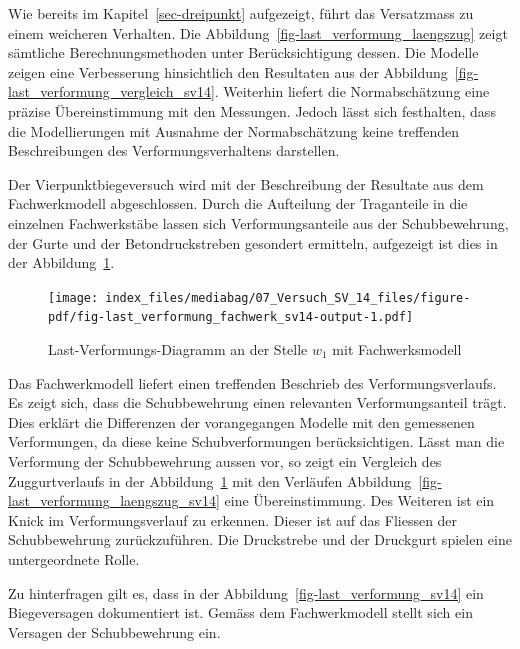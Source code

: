 \documentclass[
  12pt,
  letterpaper,
  egregdoesnotlikesansseriftitles]{scrreprt}
\begin{document}
Wie bereits im Kapitel~\ref{sec-dreipunkt} aufgezeigt, führt das
Versatzmass zu einem weicheren Verhalten. Die
Abbildung~\ref{fig-last_verformung_laengszug} zeigt sämtliche
Berechnungsmethoden unter Berücksichtigung dessen. Die Modelle zeigen
eine Verbesserung hinsichtlich den Resultaten aus der
Abbildung~\ref{fig-last_verformung_vergleich_sv14}. Weiterhin liefert
die Normabschätzung eine präzise Übereinstimmung mit den Messungen.
Jedoch lässt sich festhalten, dass die Modellierungen mit Ausnahme der
Normabschätzung keine treffenden Beschreibungen des
Verformungsverhaltens darstellen.

Der Vierpunktbiegeversuch wird mit der Beschreibung der Resultate aus
dem Fachwerkmodell abgeschlossen. Durch die Aufteilung der Traganteile
in die einzelnen Fachwerkstäbe lassen sich Verformungsanteile aus der
Schubbewehrung, der Gurte und der Betondruckstreben gesondert ermitteln,
aufgezeigt ist dies in der
Abbildung~\ref{fig-last_verformung_fachwerk_sv14}.

\begin{figure}[H]

{\centering \texttt{[image: index\_files/mediabag/07\_Versuch\_SV\_14\_files/figure-pdf/fig-last\_verformung\_fachwerk\_sv14-output-1.pdf]}

}

\caption{\label{fig-last_verformung_fachwerk_sv14}Last-Verformungs-Diagramm
an der Stelle \(w_1\) mit Fachwerksmodell}

\end{figure}

Das Fachwerkmodell liefert einen treffenden Beschrieb des
Verformungsverlaufs. Es zeigt sich, dass die Schubbewehrung einen
relevanten Verformungsanteil trägt. Dies erklärt die Differenzen der
vorangegangen Modelle mit den gemessenen Verformungen, da diese keine
Schubverformungen berücksichtigen. Lässt man die Verformung der
Schubbewehrung aussen vor, so zeigt ein Vergleich des Zuggurtverlaufs in
der Abbildung~\ref{fig-last_verformung_fachwerk_sv14} mit den Verläufen
Abbildung~\ref{fig-last_verformung_laengszug_sv14} eine Übereinstimmung.
Des Weiteren ist ein Knick im Verformungsverlauf zu erkennen. Dieser ist
auf das Fliessen der Schubbewehrung zurückzuführen. Die Druckstrebe und
der Druckgurt spielen eine untergeordnete Rolle.

Zu hinterfragen gilt es, dass in der
Abbildung~\ref{fig-last_verformung_sv14} ein Biegeversagen dokumentiert
ist. Gemäss dem Fachwerkmodell stellt sich ein Versagen der
Schubbewehrung ein.
\end{document}
